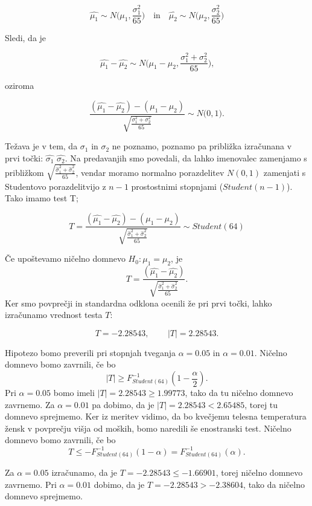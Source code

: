 \documentclass[12pt, a4paper]{article}
\begin{document}
$$\hat{\mu_1} \sim N\Big(\mu_1, \frac{\sigma_1^2}{65}\Big) \quad \text{in} 
\quad \hat{\mu_2} \sim N\Big(\mu_2, \frac{\sigma_2^2}{65}\Big)$$

Sledi, da je 

$$\hat{\mu_1} - \hat{\mu_2} \sim N\Big(\mu_1 - \mu_2, \frac{\sigma_1^2 + 
\sigma_2^2}{65}\Big) \text{,}
$$

oziroma

$$ \frac{(\hat{\mu_1} - \hat{\mu_2}) - (\mu_1 - \mu_2)}
{\sqrt{\frac{\sigma_1^2 + \sigma_2^2}{65}}}
\sim N\big(0, 1\big) \text{.}
$$ 

Težava je v tem, da $\sigma_1$ in $\sigma_2$ ne poznamo, poznamo pa približka
izračunana v prvi točki: $\hat{\sigma_1}$ $\hat{\sigma_2}$. Na predavanjih
smo povedali, da lahko imenovalec
zamenjamo s približkom ${\sqrt{\frac{\hat{\sigma}_1^2 + \hat{\sigma}_2^2}{65}}} $, 
vendar moramo normalno porazdelitev $N(0,1)$ zamenjati s Studentovo porazdelitvijo
z $n-1$ prostostnimi stopnjami ($Student(n-1)$). Tako imamo test T;

$$T = \frac{(\hat{\mu_1} - \hat{\mu_2}) - (\mu_1 - \mu_2)}
{\sqrt{\frac{\hat{\sigma}_1^2 + \hat{\sigma}_2^2}{65}}}
\sim Student(64)
$$ 

Če upoštevamo ničelno domnevo $H_0 : \mu_1 = \mu_2$, je 
$$T = \frac{(\hat{\mu_1} - \hat{\mu_2})} {\sqrt{\frac{\hat{\sigma}_1^2 + 
\hat{\sigma}_2^2}{65}}}\text{.}
$$
Ker 
smo povprečji in standardna odklona ocenili že pri prvi točki, lahko izračunamo
vrednost testa $T$:

$$T = -2.28543 \text{, } \qquad |T| = 2.28543 \text{.}
$$

Hipotezo bomo preverili pri stopnjah tveganja $\alpha = 0.05$ in $\alpha = 0.01$.
Ničelno domnevo bomo zavrnili, če bo 
$$|T| \geq F^{-1}_{Student(64)}(1-\frac{\alpha}{2}) \text{.}
$$ 
Pri $\alpha = 0.05$ bomo imeli $|T| = 2.28543 \geq 1.99773$, tako da tu ničelno
domnevo zavrnemo. Za $\alpha = 0.01$ pa dobimo, da je $|T| = 2.28543 < 2.65485$,
torej tu domnevo sprejmemo.
Ker iz meritev vidimo, da bo kvečjemu telesna temperatura žensk v povprečju 
višja od moških, bomo naredili še enostranski test. Ničelno domnevo bomo zavrnili, 
če bo 
$$T \leq - F^{-1}_{Student(64)}(1-\alpha) = F^{-1}_{Student(64)}(\alpha) \text{.}
$$

Za $\alpha = 0.05$ izračunamo, da je $T = -2.28543 \leq -1.66901$, torej ničelno domnevo 
zavrnemo. Pri $\alpha = 0.01$ dobimo, da je $T = -2.28543 > -2.38604$, tako da 
ničelno domnevo sprejmemo. 

\end{document}

